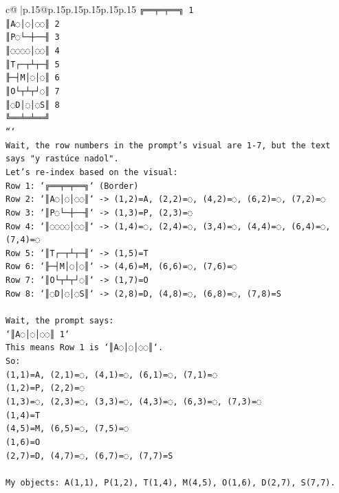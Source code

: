 \documentclass{article}
\begin{document}
{\begin{supertabular}{c@{$\;$}|p{.15\linewidth}@{}p{.15\linewidth}p{.15\linewidth}p{.15\linewidth}p{.15\linewidth}p{.15\linewidth}}
{{{\texttt{╔══╤═╤══╗ 1} \\
\texttt{║A◌│◌│◌◌║ 2} \\
\texttt{║P◌└─┼──╢ 3} \\
\texttt{║◌◌◌◌│◌◌║ 4} \\
\texttt{║T┌─┬┴┬─╢ 5} \\
\texttt{╟─┤M│◌│◌║ 6} \\
\texttt{║O└┬┴┬┘◌║ 7} \\
\texttt{║◌D│◌│◌S║ 8} \\
\texttt{╚══╧═╧══╝} \\
\texttt{```} \\
\texttt{Wait, the row numbers in the prompt's visual are 1{-}7, but the text says "y rastúce nadol".} \\
\texttt{Let's re{-}index based on the visual:} \\
\texttt{Row 1: `╔══╤═╤══╗` (Border)} \\
\texttt{Row 2: `║A◌│◌│◌◌║` {-}> (1,2)=A, (2,2)=◌, (4,2)=◌, (6,2)=◌, (7,2)=◌} \\
\texttt{Row 3: `║P◌└─┼──╢` {-}> (1,3)=P, (2,3)=◌} \\
\texttt{Row 4: `║◌◌◌◌│◌◌║` {-}> (1,4)=◌, (2,4)=◌, (3,4)=◌, (4,4)=◌, (6,4)=◌, (7,4)=◌} \\
\texttt{Row 5: `║T┌─┬┴┬─╢` {-}> (1,5)=T} \\
\texttt{Row 6: `╟─┤M│◌│◌║` {-}> (4,6)=M, (6,6)=◌, (7,6)=◌} \\
\texttt{Row 7: `║O└┬┴┬┘◌║` {-}> (1,7)=O} \\
\texttt{Row 8: `║◌D│◌│◌S║` {-}> (2,8)=D, (4,8)=◌, (6,8)=◌, (7,8)=S} \\
\\ 
\texttt{Wait, the prompt says:} \\
\texttt{`║A◌│◌│◌◌║ 1`} \\
\texttt{This means Row 1 is `║A◌│◌│◌◌║`.} \\
\texttt{So:} \\
\texttt{(1,1)=A, (2,1)=◌, (4,1)=◌, (6,1)=◌, (7,1)=◌} \\
\texttt{(1,2)=P, (2,2)=◌} \\
\texttt{(1,3)=◌, (2,3)=◌, (3,3)=◌, (4,3)=◌, (6,3)=◌, (7,3)=◌} \\
\texttt{(1,4)=T} \\
\texttt{(4,5)=M, (6,5)=◌, (7,5)=◌} \\
\texttt{(1,6)=O} \\
\texttt{(2,7)=D, (4,7)=◌, (6,7)=◌, (7,7)=S} \\
\\ 
\texttt{My objects: A(1,1), P(1,2), T(1,4), M(4,5), O(1,6), D(2,7), S(7,7).} \\
}}}
\end{supertabular}}
\end{document}
